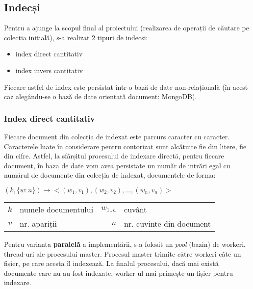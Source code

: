 \documentclass[12pt]{article}
\begin{document}
\subsection{Indecși}
Pentru a ajunge la scopul final al proiectului (realizarea de operații de căutare pe colecția inițială), s-a realizat 2 tipuri de indecși:
\begin{itemize}
	\item index direct cantitativ
	\item index invers cantitativ
\end{itemize}
Fiecare astfel de index este persistat într-o bază de date non-relațională (în acest caz alegându-se o bază de date orientată document: MongoDB).
\subsubsection{Index direct cantitativ}
Fiecare document din colecția de indexat este parcurs caracter cu caracter. Caracterele luate în considerare pentru contorizat sunt alcătuite fie din litere, fie din cifre.
Astfel, la sfârșitul procesului de indexare directă, pentru fiecare document, în baza de date vom avea persistate un număr de intrări egal cu numărul de documente din colecția de indexat, documentele de forma:
\begin{center}
$(k,\{w:n\}) \longrightarrow <(w_{1}, v_{1}), (w_{2}, v_{2}), \dots, (w_{n}, v_{n})>$
\begin{tabular}{r@{: }l r@{: }l}
	$k$ & numele documentului & $w_{1..n}$ & cuvânt\\
	$v$& nr. apariții & $n$ & nr. cuvinte din document
\end{tabular}
\end{center}
Pentru varianta \textbf{paralelă} a implementării, s-a folosit un \textit{pool} (bazin) de workeri, thread-uri ale procesului master. Procesul master trimite către workeri câte un fișier, pe care acesta îl indexează. La finalul procesului, dacă mai există documente care nu au fost indexate, worker-ul mai primește un fișier pentru indexare. 
\end{document}
